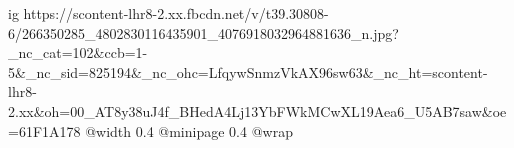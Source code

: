 
 
 
 
 

\ifcmt
  ig https://scontent-lhr8-2.xx.fbcdn.net/v/t39.30808-6/266350285_4802830116435901_4076918032964881636_n.jpg?_nc_cat=102&ccb=1-5&_nc_sid=825194&_nc_ohc=LfqywSnmzVkAX96sw63&_nc_ht=scontent-lhr8-2.xx&oh=00_AT8y38uJ4f_BHedA4Lj13YbFWkMCwXL19Aea6_U5AB7saw&oe=61F1A178
  @width 0.4
  @minipage 0.4
  @wrap \parpic[r]
\fi
